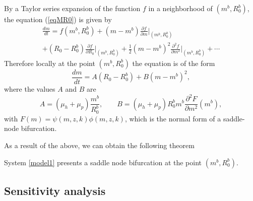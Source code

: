 \documentclass[eng]{MMSB-class-eng}
\begin{document}
{By a Taylor series expansion of the function $f$ in a neighborhood of $(m^b,R_0^b)$, the equation (\ref{eqMR0}) is given by
\begin{multline}
	\frac{dm}{dt}=f(m^b,R_0^b)+(m-m^b)\frac{\partial f }{\partial m}\big\vert_{(m^b,R_0^b)}\\ 
	+(R_0-R_0^b){\frac{\partial f }{\partial R_0}\big\vert_{(m^b,R_0^b)}}%
+{\frac {1}{2}}(m-m^b)^2{\frac{\partial^2 f }{\partial m^2}}\big\vert_{(m^b,R_0^b)}%
	+\cdots 
\end{multline}
Therefore locally at the point $(m^b,R_0^b)$ the equation is of the form
\begin{equation}
\dfrac{dm}{dt}=A(R_0- R_0^b)+B(m- m^b)^2,
\end{equation}
where the values $A$ and $B$ are
\begin{equation}
A=(\mu_h +\mu_p)\frac{ m^b}{ R_0^b}, \qquad  B=(\mu_h + \mu_p) R_0^b  m^b \frac{\partial^2 F}{\partial m^2}( m^b),
\end{equation}
with $F(m)= \psi(m,z,k)\phi(m,z, k)$,
which is the normal form of a saddle-node bifurcation.

{\color{blue}
As a result of the above, we can obtain the following theorem
\begin{theorem}
	System \eqref{model1} presents a saddle node bifurcation at the point $(m^b,R_0^b)$.
\end{theorem}
}

}


\subsection{Sensitivity analysis}
	
\end{document}
